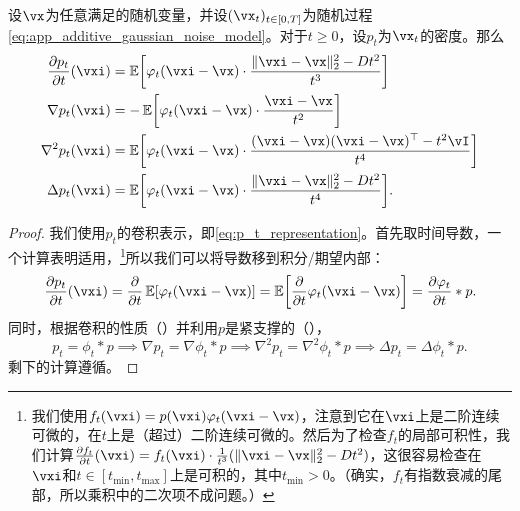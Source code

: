 \documentclass[../../book-main.tex]{subfiles}
\begin{document}
\begin{proposition}\label{prop:p_t_derivatives}
    设\(\vx\)为任意满足的随机变量，并设\((\vx_{t})_{t \in [0, T]}\)为随机过程\eqref{eq:app_additive_gaussian_noise_model}。对于\(t \geq 0\)，设\(p_{t}\)为\(\vx_{t}\)的密度。那么
    \begin{align}
        \pdv{p_{t}}{t}(\vxi)
        &= \Ex\rs{\phi_{t}(\vxi - \vx)\cdot\frac{\norm{\vxi - \vx}_{2}^{2} - Dt^{2}}{t^{3}}} \\
        \nabla p_{t}(\vxi)
        &= -\Ex\rs{\phi_{t}(\vxi - \vx)\cdot\frac{\vxi - \vx}{t^{2}}} \\
        \nabla^{2}p_{t}(\vxi)
        &= \Ex\rs{\phi_{t}(\vxi - \vx)\cdot\frac{(\vxi - \vx)(\vxi - \vx)^{\top} - t^{2}\vI}{t^{4}}} \\ 
        \Delta p_{t}(\vxi)
        &= \Ex\rs{\phi_{t}(\vxi - \vx)\cdot\frac{\norm{\vxi - \vx}_{2}^{2} - Dt^{2}}{t^{4}}}.
    \end{align}
\end{proposition}
\begin{proof} 
    我们使用\(p_{t}\)的卷积表示，即\eqref{eq:p_t_representation}。首先取时间导数，一个计算表明适用，\footnote{我们使用\(f_{t}(\vxi) = p(\vxi) \phi_{t}(\vxi - \vx)\)，注意到它在\(\vxi\)上是二阶连续可微的，在\(t\)上是（超过）二阶连续可微的。然后为了检查\(f_{t}\)的局部可积性，我们计算\(\pdv{f_{t}}{t}(\vxi) = f_{t}(\vxi)\cdot \frac{1}{t^{3}}(\norm{\vxi - \vx}_{2}^{2} - Dt^{2})\)，这很容易检查在\(\vxi\)和\(t \in [t_{\min}, t_{\max}]\)上是可积的，其中\(t_{\min} > 0\)。（确实，\(f_{t}\)有指数衰减的尾部，所以乘积中的二次项不成问题。）}所以我们可以将导数移到积分/期望内部：
    \begin{equation}
        \pdv{p_{t}}{t}(\vxi) = \pdv*{\Ex[\phi_{t}(\vxi - \vx)]}{t} = \Ex\rs{\pdv*{\phi_{t}(\vxi - \vx)}{t}} = \pdv{\phi_{t}}{t} * p.
    \end{equation}
    同时，根据卷积的性质（）并利用\(p\)是紧支撑的（），
    \begin{equation}
        p_{t} = \phi_{t} * p \implies \nabla p_{t} = \nabla \phi_{t} * p \implies \nabla^{2}p_{t} = \nabla^{2}\phi_{t} * p \implies \Delta p_{t} = \Delta \phi_{t} * p.
    \end{equation}
    剩下的计算遵循。
\end{proof}
\end{document}
